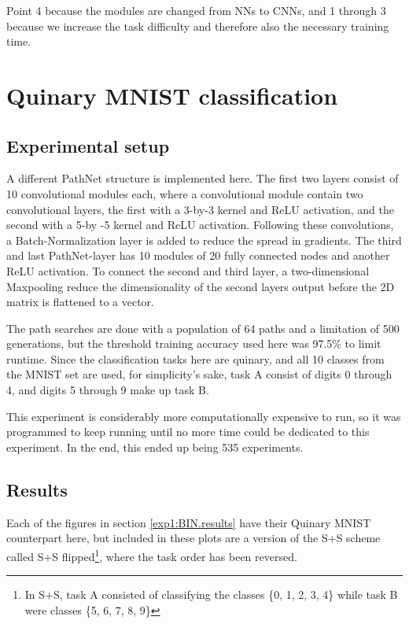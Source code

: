 Point 4 because the modules are changed from NNs to CNNs, and 1 through 3 because we increase the task difficulty and therefore also the necessary training time. 

\section{Quinary MNIST classification}
\subsection{Experimental setup}
A different PathNet structure is implemented here. The first two layers consist of 10 convolutional modules each, where a convolutional module contain two convolutional layers, the first with a 3-by-3 kernel and ReLU activation, and the second with a 5-by -5 kernel and ReLU activation. Following these convolutions, a Batch-Normalization layer is added to reduce the spread in gradients. The third and last PathNet-layer has 10 modules of 20 fully connected nodes and another ReLU activation. To connect the second and third layer, a two-dimensional Maxpooling reduce the dimensionality of the second layers output before the 2D matrix is flattened to a vector.   

The path searches are done with a population of 64 paths and a limitation of 500 generations, but the threshold training accuracy used here was 97.5\% to limit runtime. Since the classification tasks here are quinary, and all 10 classes from the MNIST set are used, for simplicity's sake, task A consist of digits 0 through 4, and digits 5 through 9 make up task B. 

This experiment is considerably more computationally expensive to run, so it was programmed to keep running until no more time could be dedicated to this experiment. In the end, this ended up being 535 experiments. 

\subsection{Results}
\label{exp1:results.quinary}
Each of the figures in section \ref{exp1:BIN.results} have their Quinary MNIST counterpart here, but included in these plots are a version of the S+S scheme called S+S flipped\footnote{In S+S, task A consisted of classifying the classes \{0, 1, 2, 3, 4\} while task B were classes \{5, 6, 7, 8, 9\}}, where the task order has been reversed.

